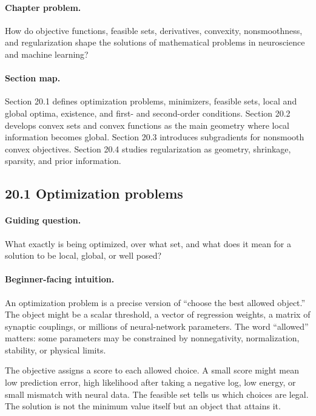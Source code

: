 \paragraph{Chapter problem.}
How do objective functions, feasible sets, derivatives, convexity, nonsmoothness, and regularization shape the solutions of mathematical problems in neuroscience and machine learning?

\paragraph{Section map.}
Section 20.1 defines optimization problems, minimizers, feasible sets, local and global optima, existence, and first- and second-order conditions. Section 20.2 develops convex sets and convex functions as the main geometry where local information becomes global. Section 20.3 introduces subgradients for nonsmooth convex objectives. Section 20.4 studies regularization as geometry, shrinkage, sparsity, and prior information.

\subsection{20.1 Optimization problems}

\paragraph{Guiding question.}
What exactly is being optimized, over what set, and what does it mean for a solution to be local, global, or well posed?

\paragraph{Beginner-facing intuition.}
An optimization problem is a precise version of ``choose the best allowed object.'' The object might be a scalar threshold, a vector of regression weights, a matrix of synaptic couplings, or millions of neural-network parameters. The word ``allowed'' matters: some parameters may be constrained by nonnegativity, normalization, stability, or physical limits.

The objective assigns a score to each allowed choice. A small score might mean low prediction error, high likelihood after taking a negative log, low energy, or small mismatch with neural data. The feasible set tells us which choices are legal. The solution is not the minimum value itself but an object that attains it.

